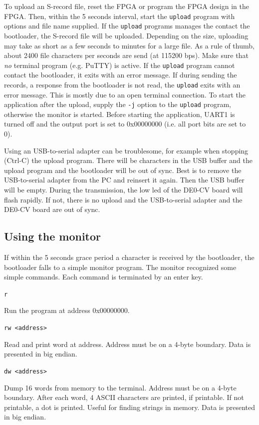 \documentclass[12pt]{article}
\begin{document}
To upload an S-record file, reset the FPGA or program the FPGA design in the FPGA. Then, within the 5 seconds interval, start the \lstinline|upload| program with options and file name supplied. If the \lstinline|upload| programs manages the contact the bootloader, the S-record file will be uploaded. Depending on the size, uploading may take as short as a few seconds to minutes for a large file. As a rule of thumb, about 2400 file characters per seconds are send (at 115200 bps). Make sure that \emph{no} terminal program (e.g. PuTTY) is active. If the \lstinline|upload| program cannot contact the bootloader, it exits with an error message. If during sending the records, a response from the bootloader is not read, the \lstinline|upload| exits with an error message. This is mostly due to an open terminal connection. To start the application after the upload, supply the \lstinline|-j| option to the \lstinline|upload| program, otherwise the monitor is started. Before starting the application, UART1 is turned off and the output port is set to 0x00000000 (i.e. all port bits are set to 0).

Using an USB-to-serial adapter can be troublesome, for example when stopping (Ctrl-C) the upload program. There will be characters in the USB buffer and the upload program and the bootloader will be out of sync. Best is to remove the USB-to-serial adapter from the PC and reinsert it again. Then the USB buffer will be empty. During the transmission, the low led of the DE0-CV board will flash rapidly. If not, there is no upload and the USB-to-serial adapter and the DE0-CV board are out of sync.

\subsection{Using the monitor}
If within the 5 seconds grace period a character is received by the bootloader, the bootloader falls to a simple monitor program. The monitor recognized some simple commands. Each command is terminated by an enter key.

\lstinline|r|

Run the program at address 0x00000000.

\lstinline|rw <address>|

Read and print word at address. Address must be on a 4-byte boundary. Data is presented in big endian.

\lstinline|dw <address>|

Dump 16 words from memory to the terminal. Address must be on a 4-byte boundary. After each word, 4 ASCII characters are printed, if printable. If not printable, a dot is printed. Useful for finding strings in memory. Data is presented in big endian.
\end{document}
